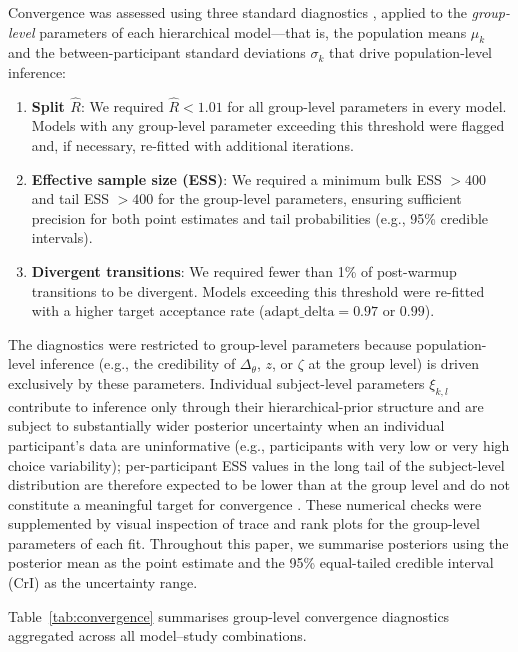 \documentclass[man,floatsintext]{apa7}
\begin{document}
Convergence was assessed using three standard diagnostics \parencite{vehtari_rank_2021}, applied to the \emph{group-level} parameters of each hierarchical model---that is, the population means $\mu_k$ and the between-participant standard deviations $\sigma_k$ that drive population-level inference:
\begin{enumerate}
    \item \textbf{Split $\hat{R}$}: We required $\hat{R} < 1.01$ for all group-level parameters in every model. Models with any group-level parameter exceeding this threshold were flagged and, if necessary, re-fitted with additional iterations.
    \item \textbf{Effective sample size (ESS)}: We required a minimum bulk ESS $> 400$ and tail ESS $> 400$ for the group-level parameters, ensuring sufficient precision for both point estimates and tail probabilities (e.g., 95\% credible intervals).
    \item \textbf{Divergent transitions}: We required fewer than 1\% of post-warmup transitions to be divergent. Models exceeding this threshold were re-fitted with a higher target acceptance rate ($\text{adapt\_delta} = 0.97$ or $0.99$).
\end{enumerate}

The diagnostics were restricted to group-level parameters because population-level inference (e.g., the credibility of $\Delta_\theta$, $z$, or $\zeta$ at the group level) is driven exclusively by these parameters. Individual subject-level parameters $\xi_{k,l}$ contribute to inference only through their hierarchical-prior structure and are subject to substantially wider posterior uncertainty when an individual participant's data are uninformative (e.g., participants with very low or very high choice variability); per-participant ESS values in the long tail of the subject-level distribution are therefore expected to be lower than at the group level and do not constitute a meaningful target for convergence \parencite{gelman_bayesian_2013}. These numerical checks were supplemented by visual inspection of trace and rank plots for the group-level parameters of each fit. Throughout this paper, we summarise posteriors using the posterior mean as the point estimate and the 95\% equal-tailed credible interval (CrI) as the uncertainty range.

Table~\ref{tab:convergence} summarises group-level convergence diagnostics aggregated across all model--study combinations.
\end{document}
